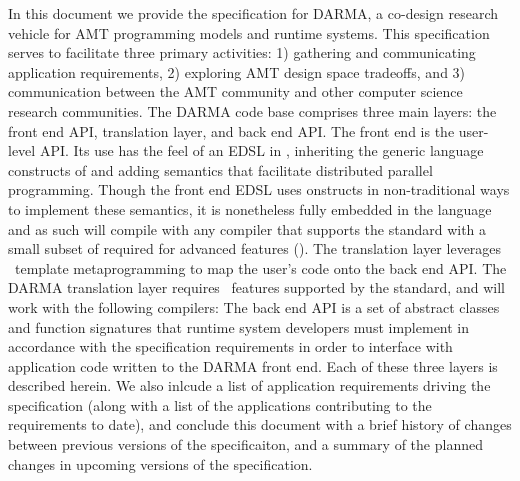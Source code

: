 
In this document we provide the specification for DARMA,
a co-design research vehicle for \gls{AMT} programming models and runtime
systems.  This specification serves to facilitate three primary activities: 
1) gathering and communicating application requirements, 2) exploring AMT
design space tradeoffs, and 3) communication between the AMT community and
other computer science research communities.
The DARMA code base comprises three main layers: the \gls{front end} \gls{API},
\gls{translation layer}, and
\gls{back end} \gls{API}.  The \gls{front end} is the user-level \gls{API}. 
Its use has the feel of an \gls{EDSL} in \CC,  inheriting the generic
language constructs of \CC and adding \gls{semantics} that facilitate
distributed parallel programming.  Though the \gls{front end} \gls{EDSL} uses
\CC onstructs in non-traditional ways to implement these semantics, it is
nonetheless fully embedded in the \CC language and as such will compile with any
\CC compiler that supports the  standard with a small subset of  required for advanced features ().  The \gls{translation layer} leverages \CC\ \gls{template
metaprogramming} to map the user's code onto the \gls{back end} \gls{API}.
The DARMA \gls{translation layer} requires \CC\ features supported by the 
standard, and will work with the following compilers: 
The \gls{back end} \gls{API} is a set of abstract classes and function
signatures that runtime system developers must implement in accordance with the
specification requirements in order to interface with application code written
to the DARMA front end.  Each of these three layers is described herein. We also
inlcude a list of application requirements driving the specification (along
with a list of the applications contributing to the requirements to date), and
conclude this document with a brief history of changes between previous
versions of the specificaiton, and a summary of the planned changes in upcoming
versions of the specification.

